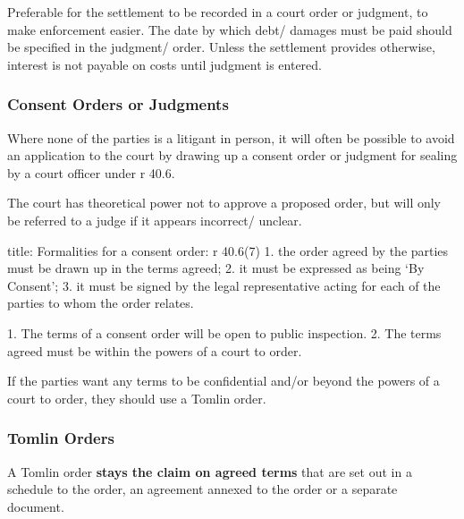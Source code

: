 \documentclass[
]{article}
\newenvironment{Shaded}{}{}
\newcommand{\NormalTok}[1]{#1}
\begin{document}
Preferable for the settlement to be recorded in a court order or
judgment, to make enforcement easier. The date by which debt/ damages
must be paid should be specified in the judgment/ order. Unless the
settlement provides otherwise, interest is not payable on costs until
judgment is entered.

\hypertarget{consent-orders-or-judgments}{%
\subsubsection{Consent Orders or
Judgments}\label{consent-orders-or-judgments}}

Where none of the parties is a litigant in person, it will often be
possible to avoid an application to the court by drawing up a consent
order or judgment for sealing by a court officer under r 40.6.

The court has theoretical power not to approve a proposed order, but
will only be referred to a judge if it appears incorrect/ unclear.

\begin{Shaded}
\begin{Highlighting}[]
\NormalTok{title: Formalities for a consent order: r 40.6(7)}
\NormalTok{1. the order agreed by the parties must be drawn up in the terms agreed;}
\NormalTok{2. it must be expressed as being ‘By Consent’;}
\NormalTok{3. it must be signed by the legal representative acting for each of the parties to whom the order relates.}
\end{Highlighting}
\end{Shaded}

\begin{Shaded}
\begin{Highlighting}[]
\NormalTok{1. The terms of a consent order will be open to public inspection. }
\NormalTok{2. The terms agreed must be within the powers of a court to order. }
\end{Highlighting}
\end{Shaded}

If the parties want any terms to be confidential and/or beyond the
powers of a court to order, they should use a Tomlin order.

\hypertarget{tomlin-orders}{%
\subsubsection{Tomlin Orders}\label{tomlin-orders}}

A Tomlin order \textbf{stays the claim on agreed terms} that are set out
in a schedule to the order, an agreement annexed to the order or a
separate document.
\end{document}
